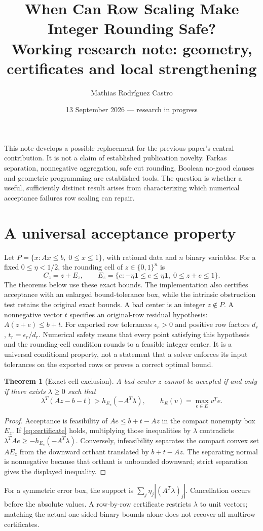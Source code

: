 \documentclass[11pt]{article}
\title{When Can Row Scaling Make Integer Rounding Safe?\\\large Working research note: geometry, certificates and local strengthening}
\author{Mathias Rodr\'iguez Castro}
\date{13 September 2026 --- research in progress}
\newtheorem{theorem}{Theorem}
\begin{document}
\maketitle
This note develops a possible replacement for the previous paper's central contribution.
It is not a claim of established publication novelty. Farkas separation, nonnegative
aggregation, safe cut rounding, Boolean no-good clauses and geometric programming
are established tools. The question is whether a useful, sufficiently distinct result
arises from characterizing which numerical acceptance failures row scaling can repair.

\section{A universal acceptance property}
Let $P=\{x:Ax\le b,\;0\le x\le1\}$, with rational data and $n$ binary variables.
For a fixed $0\le\eta<1/2$, the rounding cell of $z\in\{0,1\}^n$ is
\[
 C_z=z+E_z,\qquad E_z=\{e:-\eta\boldsymbol1\le e\le\eta\boldsymbol1,
                            \;0\le z+e\le1\}.
\]
The theorems below use these exact bounds. The implementation also certifies
acceptance with an enlarged bound-tolerance box, while the intrinsic obstruction
test retains the original exact bounds. A bad center is an integer
$z\notin P$. A nonnegative vector $t$ specifies an original-row residual hypothesis:
$A(z+e)\le b+t$. For exported row tolerances $\epsilon_r>0$ and positive row
factors $d_r$, $t_r=\epsilon_r/d_r$. Numerical safety means that every point satisfying
this hypothesis and the rounding-cell condition rounds to a feasible integer center.
It is a universal conditional property, not a statement that a solver enforces its
input tolerances on the exported rows or proves a correct optimal bound.

\begin{theorem}[Exact cell exclusion]
A bad center $z$ cannot be accepted if and only if there exists $\lambda\ge0$ such that
\begin{equation}\label{eq:certificate}
 \lambda^T(Az-b-t)>h_{E_z}(-A^T\lambda),
 \qquad h_E(v)=\max_{e\in E}v^Te.
\end{equation}
\end{theorem}
\begin{proof}
Acceptance is feasibility of $Ae\le b+t-Az$ in the compact nonempty box $E_z$.
If \eqref{eq:certificate} holds, multiplying those inequalities by $\lambda$ contradicts
$\lambda^TAe\ge-h_{E_z}(-A^T\lambda)$. Conversely, infeasibility separates the
compact convex set $AE_z$ from the downward orthant translated by $b+t-Az$.
The separating normal is nonnegative because that orthant is unbounded downward;
strict separation gives the displayed inequality.
\end{proof}
For a symmetric error box, the support is
$\sum_j\eta_j|(A^T\lambda)_j|$. Cancellation occurs before the absolute values.
A row-by-row certificate restricts $\lambda$ to unit vectors; matching the actual
one-sided binary bounds alone does not recover all multirow certificates.
\end{document}
